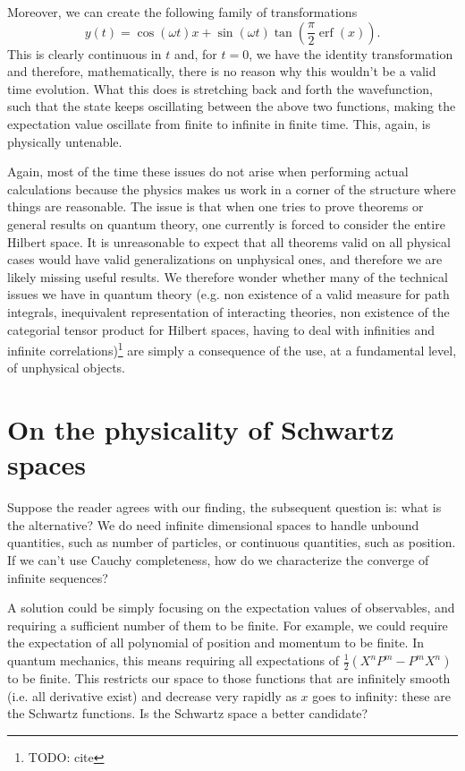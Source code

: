 \documentclass[10pt,twocolumn, nofootinbib]{revtex4-2}
\DeclareMathOperator{\erf}{erf}
\begin{document}
Moreover, we can create the following family of transformations
\begin{equation}
	y(t) = \cos(\omega t) x + \sin(\omega t) \tan \left(\frac{\pi}{2}\erf(x)\right).
\end{equation}
This is clearly continuous in $t$ and, for $t=0$, we have the identity transformation and therefore, mathematically, there is no reason why this wouldn't be a valid time evolution. What this does is stretching back and forth the wavefunction, such that the state keeps oscillating between the above two functions, making the expectation value oscillate from finite to infinite in finite time. This, again, is physically untenable.

Again, most of the time these issues do not arise when performing actual calculations because the physics makes us work in a corner of the structure where things are reasonable. The issue is that when one tries to prove theorems or general results on quantum theory, one currently is forced to consider the entire Hilbert space. It is unreasonable to expect that all theorems valid on all physical cases would have valid generalizations on unphysical ones, and therefore we are likely missing useful results. We therefore wonder whether many of the technical issues we have in quantum theory (e.g. non existence of a valid measure for path integrals, inequivalent representation of interacting theories, non existence of the categorial tensor product for Hilbert spaces, having to deal with infinities and infinite correlations)\footnote{TODO: cite} are simply a consequence of the use, at a fundamental level, of unphysical objects.

\section{On the physicality of Schwartz spaces}

Suppose the reader agrees with our finding, the subsequent question is: what is the alternative? We do need infinite dimensional spaces to handle unbound quantities, such as number of particles, or continuous quantities, such as position. If we can't use Cauchy completeness, how do we characterize the converge of infinite sequences?

A solution could be simply focusing on the expectation values of observables, and requiring a sufficient number of them to be finite. For example, we could require the expectation of all polynomial of position and momentum to be finite. In quantum mechanics, this means requiring all expectations of $\frac{1}{2}(X^nP^m - P^mX^n)$ to be finite. This restricts our space to those functions that are infinitely smooth (i.e. all derivative exist) and decrease very rapidly as $x$ goes to infinity: these are the Schwartz functions. Is the Schwartz space a better candidate?
\end{document}
